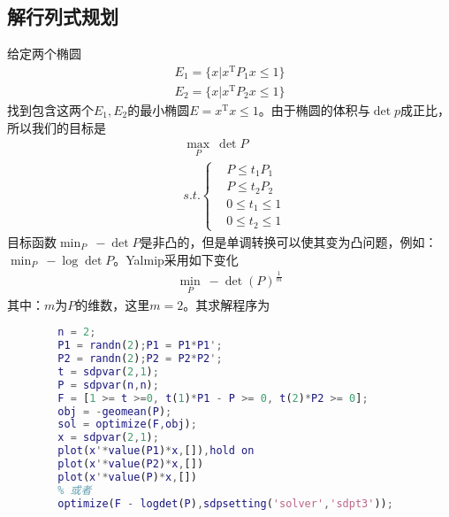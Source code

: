     \subsection{解行列式规划}
        \par
        给定两个椭圆
        \begin{align*}
        E_1 = \{x|x^\mathrm{T}P_1x \leqslant 1\}\\
        E_2 = \{x|x^\mathrm{T}P_2x \leqslant 1\}
        \end{align*}
        找到包含这两个$E_1,E_2$的最小椭圆$E = x^\mathrm{T}x \leqslant 1$。由于椭圆的体积与$\det p$成正比，所以我们的目标是
        \begin{align*}
        & \max_P \ \det P\\
        & s.t.\left\{
        \begin{aligned}
        & P \leqslant t_1P_1\\
        & P \leqslant t_2P_2\\
        & 0 \leqslant t_1 \leqslant 1\\
        & 0 \leqslant t_2 \leqslant 1
        \end{aligned}
        \right.
        \end{align*}
        目标函数$\min_P \ -\det P$是非凸的，但是单调转换可以使其变为凸问题，例如：$\min_P\ -\log \det P$。Yalmip采用如下变化
        \begin{align*}
        \min_P\ -\det (P)^{\frac{1}{m}}
        \end{align*}
        其中：$m$为$P$的维数，这里$m = 2$。其求解程序为
        \begin{lstlisting}[language = Matlab]
        %% 行列式规划
        n = 2;
        P1 = randn(2);P1 = P1*P1';
        P2 = randn(2);P2 = P2*P2';
        t = sdpvar(2,1);
        P = sdpvar(n,n);
        F = [1 >= t >=0, t(1)*P1 - P >= 0, t(2)*P2 >= 0];
        obj = -geomean(P);
        sol = optimize(F,obj);
        x = sdpvar(2,1);
        plot(x'*value(P1)*x,[]),hold on
        plot(x'*value(P2)*x,[])
        plot(x'*value(P)*x,[])
        % 或者
        optimize(F - logdet(P),sdpsetting('solver','sdpt3'));
        \end{lstlisting}
